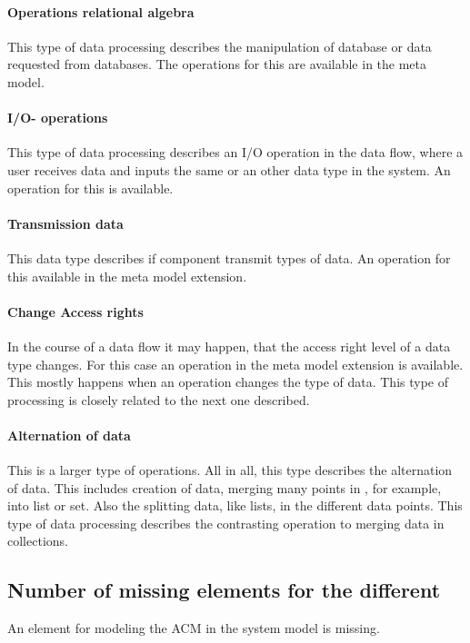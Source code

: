 \paragraph{Operations relational algebra}
This type of data processing describes the manipulation of database or data requested from databases. The operations for this are available in the meta model. 
\paragraph{I/O- operations}
This type of data processing describes an I/O operation in the data flow, where a user receives data and inputs the same or an other data type in the system. An operation for this is available. 
\paragraph{Transmission data}
This data type describes if component transmit types of data. An operation for this available in the meta model extension. 
\paragraph{Change Access rights}
In the course of a data flow it may happen, that the access right level of a data type changes. For this case an operation in the meta model extension is available. This mostly happens when an operation changes the type of data. This type of processing is closely related to the next one described. 
\paragraph{Alternation of data}
This is a larger type of operations. All in all, this type describes the alternation of data. This includes
creation of data, merging many points in , for example, into list or set. Also the splitting data, like lists, in the different data points. This type of data processing describes the contrasting operation to merging data in collections. 
\subsection{Number of missing elements for the different }
An element for modeling the ACM in the system model is missing.

